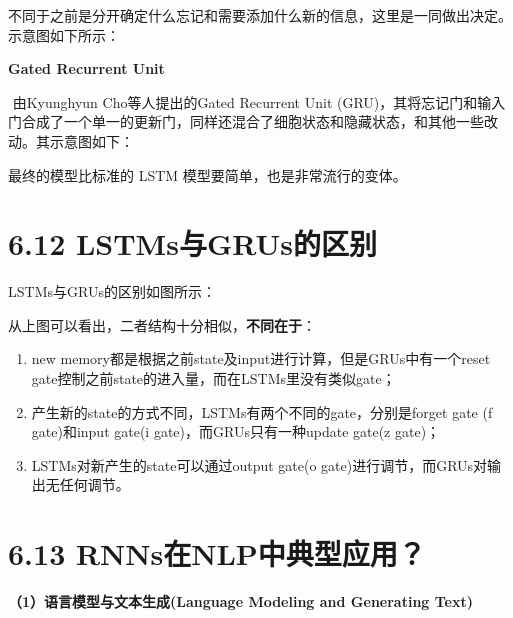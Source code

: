 ​
不同于之前是分开确定什么忘记和需要添加什么新的信息，这里是一同做出决定。示意图如下所示：


\textbf{Gated Recurrent Unit}

​ 由Kyunghyun Cho等人提出的Gated Recurrent Unit
(GRU)，其将忘记门和输入门合成了一个单一的更新门，同样还混合了细胞状态和隐藏状态，和其他一些改动。其示意图如下：


最终的模型比标准的 LSTM 模型要简单，也是非常流行的变体。

\section{6.12
LSTMs与GRUs的区别}\label{lstmsux4e0egrusux7684ux533aux522b}

LSTMs与GRUs的区别如图所示：


从上图可以看出，二者结构十分相似，\textbf{不同在于}：

\begin{enumerate}
\def\labelenumi{\arabic{enumi}.}
\item
  new memory都是根据之前state及input进行计算，但是GRUs中有一个reset
  gate控制之前state的进入量，而在LSTMs里没有类似gate；
\item
  产生新的state的方式不同，LSTMs有两个不同的gate，分别是forget gate (f
  gate)和input gate(i gate)，而GRUs只有一种update gate(z gate)；
\item
  LSTMs对新产生的state可以通过output gate(o
  gate)进行调节，而GRUs对输出无任何调节。
\end{enumerate}

\section{6.13
RNNs在NLP中典型应用？}\label{rnnsux5728nlpux4e2dux5178ux578bux5e94ux7528}

\textbf{（1）语言模型与文本生成(Language Modeling and Generating Text)}


